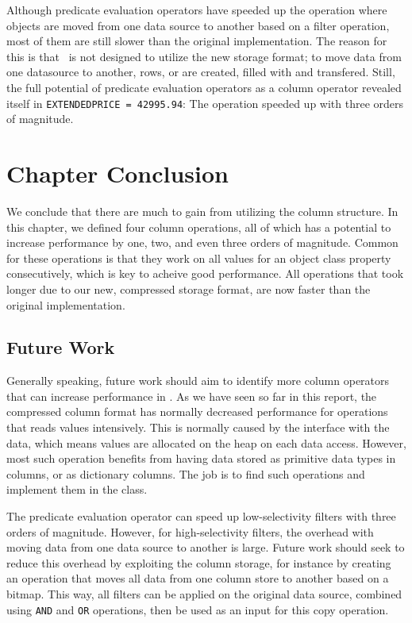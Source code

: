 Although predicate evaluation operators have speeded up the operation where objects are moved from one data source to another based on a filter operation, most of them are still slower than the original implementation. The reason for this is that \gap~is not designed to utilize the new storage format; to move data from one datasource to another, rows, or  are created, filled with  and transfered. Still, the full potential of predicate evaluation operators as a column operator revealed itself in \texttt{EXTENDEDPRICE = 42995.94}: The operation speeded up with three orders of magnitude.

\section{Chapter Conclusion}
\label{sec:Chapter Conclusion}
We conclude that there are much to gain from utilizing the column structure. In this chapter, we defined four column operations, all of which has a potential to increase performance by one, two, and even three orders of magnitude. Common for these operations is that they work on all values for an object class property consecutively, which is key to acheive good performance. All operations that took longer due to our new, compressed storage format, are now faster than the original implementation.

\subsection{Future Work}
\label{sub:Future Work}
Generally speaking, future work should aim to identify more column operators that can increase performance in \gap. As we have seen so far in this report, the compressed column format has normally decreased performance for operations that reads values intensively. This is normally caused by the  interface with the data, which means values are allocated on the heap on each data access. However, most such operation benefits from having data stored as primitive data types in columns, or as dictionary columns. The job is to find such operations and implement them in the  class.

The predicate evaluation operator can speed up low-selectivity filters with three orders of magnitude. However, for high-selectivity filters, the overhead with moving data from one data source to another is large. Future work should seek to reduce this overhead by exploiting the column storage, for instance by creating an operation that moves all data from one column store to another based on a bitmap. This way, all filters can be applied on the original data source, combined using \texttt{AND} and \texttt{OR} operations, then be used as an input for this copy operation.
